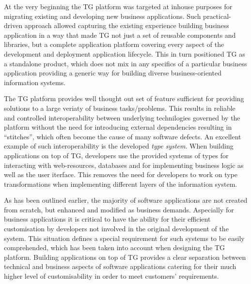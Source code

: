   At the very beginning the TG platform was targeted at inhouse purposes for migrating existing and developing new business applications.
  Such practical-driven approach allowed capturing the existing experience building business application in a way that made TG not just a set of reusable components and libraries, but a complete application platform covering every aspect of the development and deployment application lifecycle.
  This in turn positioned TG as a standalone product, which does not mix in any specifics of a particular business application providing a generic way for building diverse business-oriented information systems.

  The TG platform provides well thought out set of feature sufficient for providing solutions to a large veriaty of business tasks/problems.
  This results in reliable and controlled interoperability between underlying technilogies governed by the platform without the need for introducing external dependencies resulting in ``stitches'', which often become the cause of many software defects.
  An excellent example of such interoperability is the developed \emph{type system}.
  When building applications on top of TG, developers use the provided systems of types for interacting with web-resources, databases and for implementing business logic as well as the user iterface.
  This removes the need for developers to work on type transformations when implementing different layers of the information system.
  
  As has been outlined earlier, the majority of software applications are not created from scratch, but enhanced and modified as business demands.
  Aspecially for business applications it is critical to have the ability for their efficient customisation by developers not involved in the original development of the system.
  This situation defines a special requirement for such systems to be easily comprehended, which has been taken into account when designing the TG platform.
  Building applications on top of TG provides a clear separation between technical and business aspects of software applications catering for their much higher level of customisability in order to meet customers' requirements.